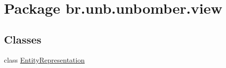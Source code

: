 \hypertarget{namespacebr_1_1unb_1_1unbomber_1_1view}{\section{Package br.\+unb.\+unbomber.\+view}
\label{namespacebr_1_1unb_1_1unbomber_1_1view}
}
\subsection*{Classes}
\begin{DoxyCompactItemize}
\item 
class \hyperlink{classbr_1_1unb_1_1unbomber_1_1view_1_1_entity_representation}{Entity\+Representation}
\end{DoxyCompactItemize}
